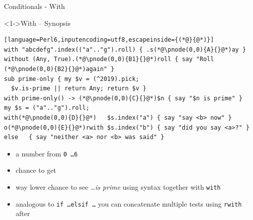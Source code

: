 \begin{frame}[fragile]{Conditionals - With}
\begin{block}<1->{With -- Synopsis}
\small
\begin{lstlisting}[language=Perl6,inputencoding=utf8,escapeinside={(*@}{@*)}]
with "abcdefg".index(("a".."g").roll) { .s(*@\pnode(0,0){A}{}@*)ay }
without (Any, True).(*@\pnode(0,0){B1}{}@*)roll { say "Roll (*@\pnode(0,0){B2}{}@*)again" }
sub prime-only { my $v = (^2019).pick;
  $v.is-prime || return Any; return $v }
with prime-only() -> (*@\pnode(0,0){C}{}@*)$n { say "$n is prime" }
my $s = ("a".."g").roll;
with(*@\pnode(0,0){D}{}@*)   $s.index("a") { say "say <b> now" }
o(*@\pnode(0,0){E}{}@*)rwith $s.index("b") { say "did you say <a>?" }
else   { say "neither <a> nor <b> was said" }
\end{lstlisting}
\end{block}

\begin{itemize}
\item<2->  a number from \texttt{0 \ldots 6}
\item<3->  chance to get 
\item<4-> way lower chance to see \textit{\ldots is prime} using  syntax together with \texttt{with}
\item<5-> analogous to \texttt{if \ldots elsif \ldots} you can concatenate multiple tests using \texttt{rwith} after 
\end{itemize}
\end{frame}

